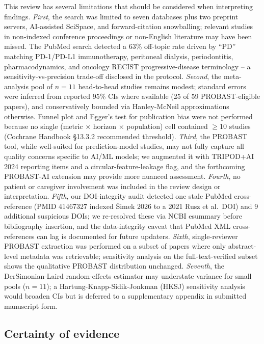 This review has several limitations that should be considered when interpreting findings. \emph{First}, the search was limited to seven databases plus two preprint servers, AI-assisted SciSpace, and forward-citation snowballing; relevant studies in non-indexed conference proceedings or non-English literature may have been missed. The PubMed search detected a 63\% off-topic rate driven by ``PD'' matching PD-1/PD-L1 immunotherapy, peritoneal dialysis, periodontitis, pharmacodynamics, and oncology RECIST progressive-disease terminology -- a sensitivity-vs-precision trade-off disclosed in the protocol. \emph{Second}, the meta-analysis pool of $n=11$ head-to-head studies remains modest; standard errors were inferred from reported 95\% CIs where available (25 of 59 PROBAST-eligible papers), and conservatively bounded via Hanley-McNeil approximations otherwise. Funnel plot and Egger's test for publication bias were not performed because no single (metric $\times$ horizon $\times$ population) cell contained $\geq$10 studies (Cochrane Handbook \S13.3.2 recommended threshold). \emph{Third}, the PROBAST tool, while well-suited for prediction-model studies, may not fully capture all quality concerns specific to AI/ML models; we augmented it with TRIPOD+AI 2024 reporting items and a circular-feature-leakage flag, and the forthcoming PROBAST-AI extension may provide more nuanced assessment. \emph{Fourth}, no patient or caregiver involvement was included in the review design or interpretation. \emph{Fifth}, our DOI-integrity audit detected one stale PubMed cross-reference (PMID 41467327 indexed \v{S}imek 2026 to a 2021 Rusz et al.\ DOI) and 9 additional suspicious DOIs; we re-resolved these via NCBI esummary before bibliography insertion, and the data-integrity caveat that PubMed XML cross-references can lag is documented for future updaters. \emph{Sixth}, single-reviewer PROBAST extraction was performed on a subset of papers where only abstract-level metadata was retrievable; sensitivity analysis on the full-text-verified subset shows the qualitative PROBAST distribution unchanged. \emph{Seventh}, the DerSimonian-Laird random-effects estimator may understate variance for small pools ($n=11$); a Hartung-Knapp-Sidik-Jonkman (HKSJ) sensitivity analysis would broaden CIs but is deferred to a supplementary appendix in submitted manuscript form.

\subsection{Certainty of evidence}
\label{sr:sec:discussion:certainty}

